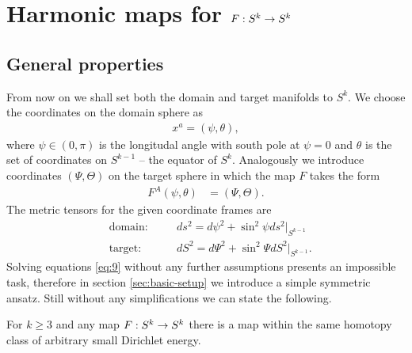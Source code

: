 \section{Harmonic maps for $F:S^k\rightarrow S^k$}
\label{sec:harmonic-maps-skra}

\subsection{General properties}
\label{sec:general-properties}

From now on we shall set both the domain and target manifolds to
$S^k$. We choose the coordinates on the domain sphere as
\begin{align}
  \label{eq:10}
  x^a=(\psi,\theta),
\end{align}
where $\psi\in(0,\pi)$ is the longitudal angle with
south pole at $\psi=0$ and $\theta$ is the set of coordinates on
$S^{k-1}$ -- the equator of $S^k$. Analogously we introduce
coordinates $(\Psi,\Theta)$ on the target sphere in which the map $F$
takes the form
\begin{align}
  \label{eq:11}
  F^A(\psi,\theta)&=(\Psi,\Theta).
\end{align}
The metric tensors for the given coordinate frames are
\begin{align}
  \label{eq:12}
  &\text{domain:}&\quad &ds^2=d\psi^2+\sin^2\psi ds^2\big|_{S^{k-1}}\\
  &\text{target:}&\quad &dS^2=d\Psi^2+\sin^2\Psi dS^2\big|_{S^{k-1}}.
\end{align}
Solving equations \eqref{eq:9} without any further assumptions
presents an impossible task, therefore in section
\ref{sec:basic-setup} we introduce a simple symmetric ansatz. Still
without any simplifications we can state the following.

\begin{theorem}\label{thm:skk-energy-bound}
  For $k\ge3$ and any map $F:S^k\rightarrow S^k$ there is a map within the
  same homotopy class of arbitrary small Dirichlet energy.
\end{theorem}

